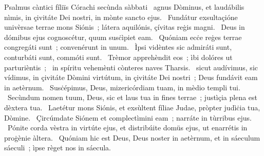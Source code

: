 { Psalmus càntici fíliïs Córachi secùnda sàbbati}
{%
~agnus Dòminus, et laudábilis nìmis, in çivitáte Dei nostri, in mònte sancto ejus. 
~Fundátur exsultaçióne univèrsae terrae mons Siónis~; látera aquilónis, çívitas reġis magni. 
~Deus in dómibus ejus cognoscétur, quum susċìpiet eam. 
~Quóniam ecċe reġes terrae congregáti sunt~; convenérunt in unum. 
~Ìpsi vidèntes sic admiráti sunt, conturbáti sunt, commóti sunt. 
~Trèmor apprehèndit eos~; ìbi dolóres ut parturièntis~; 
~in spíritu vehemènti cònteres naves Tharsis. 
~sicut audívimus, sic vídimus, in çivitáte Dòmini virtútum, in çivitáte Dei nostri~; Deus fundávit eam in aetèrnum. 
~Susċépimus, Deus, mizericórdiam tuam, in mèdio templi tui. 
~Secùndum nomen tuum, Deus, sic et laus tua in fines terrae~; justìçia plena est dèxtera tua. 
~Laetétur mons Siónis, et exsùltent fíliae Judae, pròpter judìċia tua, Dòmine. 
~Çircúmdate Siónem et complectìmini eam~; narráte in tùrribus ejus. 
~Pónite corda vèstra in virtúte ejus, et distribúite domüs ejus, ut enarrétis in proġènie àltera. 
~Quóniam hic est Deus, Deus noster in aetèrnum, et in sáeculum sáeculi~; ìpse règet nos in sáecula. 
}
